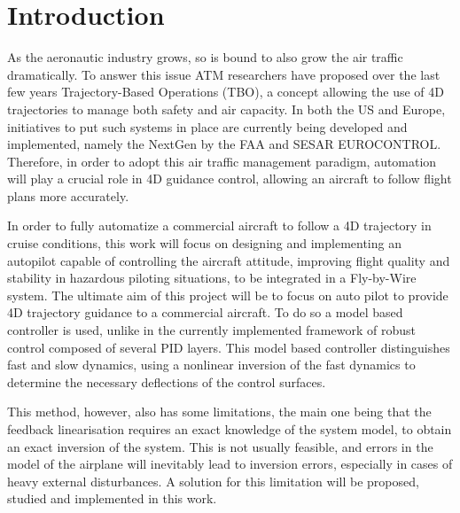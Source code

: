 
\section{Introduction}
\label{sec:intro}

As the aeronautic industry grows, so is bound to also grow the air traffic dramatically. To answer this issue ATM researchers have proposed over the last few years Trajectory-Based Operations (TBO), a concept allowing the use of 4D trajectories to manage both safety and air capacity. In both the US and Europe, initiatives to put such systems in place are currently being developed and implemented, namely the NextGen by the FAA and SESAR EUROCONTROL. Therefore, in order to adopt this air traffic management paradigm, automation will play a crucial role in 4D guidance control, allowing an aircraft to follow flight plans more accurately.

In order to fully automatize a commercial aircraft to follow a 4D trajectory in cruise conditions, this work will focus on designing and implementing an autopilot capable of controlling the aircraft attitude, improving flight quality and stability in hazardous piloting situations, to be integrated in a Fly-by-Wire system. The ultimate aim of this project will be to focus on auto pilot to provide 4D trajectory guidance to a commercial aircraft. To do so a model based controller is used, unlike in the currently implemented framework of robust control composed of several PID layers. This model based controller distinguishes fast and slow dynamics, using a nonlinear inversion of the fast dynamics to determine the necessary deflections of the control surfaces. 

This method, however, also has some limitations, the main one being that the feedback linearisation requires an exact knowledge of the system model, to obtain an exact inversion of the system. This is not usually feasible, and errors in the model of the airplane will inevitably lead to inversion errors, especially in cases of heavy external disturbances. A solution for this limitation will be proposed, studied and implemented in this work. 

